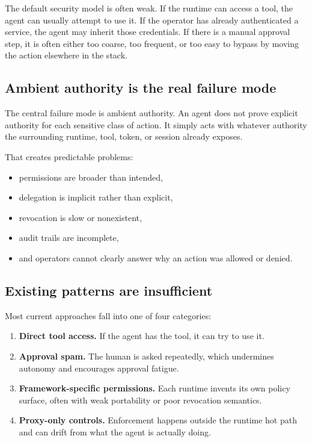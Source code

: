 \documentclass[11pt, a4paper]{article}
\begin{document}
The default security model is often weak. If the runtime can access a tool, the agent can usually attempt to use it. If the operator has already authenticated a service, the agent may inherit those credentials. If there is a manual approval step, it is often either too coarse, too frequent, or too easy to bypass by moving the action elsewhere in the stack.

\subsection{Ambient authority is the real failure mode}

The central failure mode is ambient authority. An agent does not prove explicit authority for each sensitive class of action. It simply acts with whatever authority the surrounding runtime, tool, token, or session already exposes.

That creates predictable problems:

\begin{itemize}
  \item permissions are broader than intended,
  \item delegation is implicit rather than explicit,
  \item revocation is slow or nonexistent,
  \item audit trails are incomplete,
  \item and operators cannot clearly answer why an action was allowed or denied.
\end{itemize}

\subsection{Existing patterns are insufficient}

Most current approaches fall into one of four categories:

\begin{enumerate}
  \item \textbf{Direct tool access.} If the agent has the tool, it can try to use it.
  \item \textbf{Approval spam.} The human is asked repeatedly, which undermines autonomy and encourages approval fatigue.
  \item \textbf{Framework-specific permissions.} Each runtime invents its own policy surface, often with weak portability or poor revocation semantics.
  \item \textbf{Proxy-only controls.} Enforcement happens outside the runtime hot path and can drift from what the agent is actually doing.
\end{enumerate}
\end{document}
